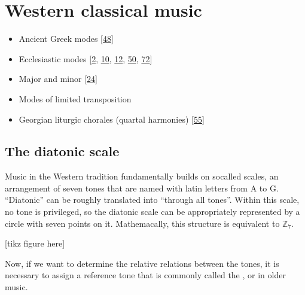 \documentclass[letterpaper,10pt,english]{sphinxmanual}
\begin{document}
\section{Western classical music}
\label{\detokenize{2_scales_modes:western-classical-music}}\begin{itemize}
\item {} 
\sphinxAtStartPar
Ancient Greek modes {[}\hyperlink{cite.8_bibliography:id59}{48}{]}

\item {} 
\sphinxAtStartPar
Ecclesiastic modes
{[}\hyperlink{cite.8_bibliography:id62}{2}, \hyperlink{cite.8_bibliography:id70}{10}, \hyperlink{cite.8_bibliography:id71}{12}, \hyperlink{cite.8_bibliography:id72}{50}, \hyperlink{cite.8_bibliography:id61}{72}{]}

\item {} 
\sphinxAtStartPar
Major and minor {[}\hyperlink{cite.8_bibliography:id78}{24}{]}

\item {} 
\sphinxAtStartPar
Modes of limited transposition

\item {} 
\sphinxAtStartPar
Georgian liturgic chorales (quartal harmonies)
{[}\hyperlink{cite.8_bibliography:id20}{55}{]}

\end{itemize}


\subsection{The diatonic scale}
\label{\detokenize{2_scales_modes:the-diatonic-scale}}
\sphinxAtStartPar
Music in the Western tradition fundamentally builds on
so\sphinxhyphen{}called  scales, an arrangement of seven tones
that are named with latin letters from A to G. “Diatonic” can
be roughly translated into “through all tones”. Within this scale,
no tone is privileged, so the diatonic scale can be appropriately
represented by a circle with seven points on it. Mathemacally,
this structure is equivalent to \(\mathbb{Z}_7\).

\sphinxAtStartPar
{[}tikz figure here{]}

\sphinxAtStartPar
Now, if we want to determine the relative relations between the tones,
it is necessary to assign a reference tone that is commonly called the ,
or  in older music.
\end{document}
